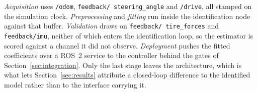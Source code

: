 \emph{Acquisition} uses \texttt{/odom}, \texttt{feedback/\allowbreak
steering\_angle} and \texttt{/drive}, all stamped on the simulation clock.
\emph{Preprocessing} and \emph{fitting} run inside the identification node
against that buffer. \emph{Validation} draws on \texttt{feedback/\allowbreak
tire\_forces} and \texttt{feedback/imu}, neither of which enters the
identification loop, so the estimator is scored against a channel it did not
observe. \emph{Deployment} pushes the fitted coefficients over a ROS~2 service
to the controller behind the gates of Section~\ref{sec:integration}. Only the
last stage leaves the architecture, which is what lets
Section~\ref{sec:results} attribute a closed-loop difference to the identified
model rather than to the interface carrying it.
